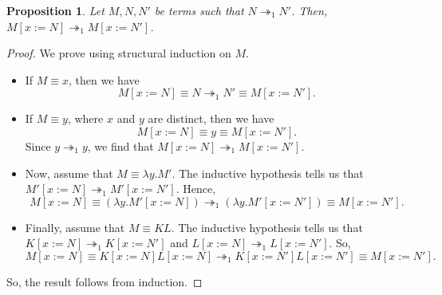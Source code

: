 \documentclass[a4paper, openany]{memoir}
\newtheorem{proposition}{Proposition}[section]
\theoremstyle{definition}
\begin{document}
    \begin{proposition}
        Let $M, N, N'$ be terms such that $N \twoheadrightarrow_1 N'$. Then, $M[x := N] \twoheadrightarrow_1 M[x := N']$.
    \end{proposition}
    \begin{proof}
        We prove using structural induction on $M$.
        \begin{itemize}
            \item If $M \equiv x$, then we have
            \[M[x := N] \equiv N \twoheadrightarrow_1 N' \equiv M[x := N'].\]

            \item If $M \equiv y$, where $x$ and $y$ are distinct, then we have
            \[M[x := N] \equiv y \equiv M[x:= N'].\]
            Since $y \twoheadrightarrow_1 y$, we find that $M[x := N] \twoheadrightarrow_1 M[x := N']$.

            \item Now, assume that $M \equiv \lambda y.M'$. The inductive hypothesis tells us that $M'[x := N] \twoheadrightarrow_1 M'[x := N']$. Hence, 
            \[M[x := N] \equiv (\lambda y.M' [x := N]) \twoheadrightarrow_1 (\lambda y.M' [x := N']) \equiv M [x := N'].\]

            \item Finally, assume that $M \equiv KL$. The inductive hypothesis tells us that $K[x := N] \twoheadrightarrow_1 K[x := N']$ and $L[x := N] \twoheadrightarrow_1 L[x := N']$. So,
            \[M[x:= N] \equiv K[x := N] L[x := N] \twoheadrightarrow_1 K[x := N'] L[x := N'] \equiv M[x := N'].\]
        \end{itemize}
        So, the result follows from induction.
    \end{proof}
\end{document}
